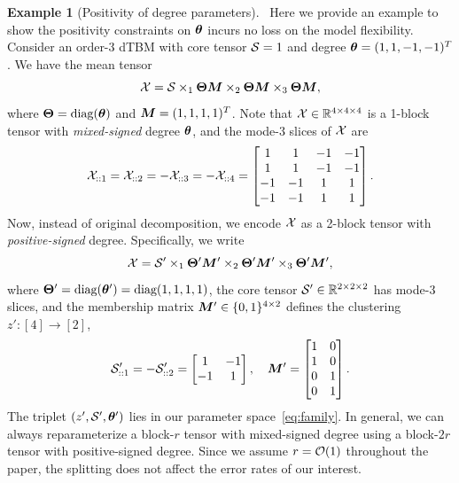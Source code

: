 \documentclass[lettersize,onecolumn,journal]{IEEEtran}
\theoremstyle{definition}
\theoremstyle{definition}
\newtheorem{example}{Example}
\begin{document}
\begin{example}[Positivity of degree parameters]~\label{ex:positive}
Here we provide an example to show the positivity constraints on $\boldsymbol{\theta}$ incurs no loss on the model flexibility. 
Consider an order-3 dTBM with core tensor $\mathcal{S} = 1$ and degree $\boldsymbol{\theta} = (1,1,-1, -1)^T$. We have the mean tensor 
\begin{equation}
    \mathcal{X} = \mathcal{S} \times_1 \boldsymbol{\Theta} \bm M \times_2 \boldsymbol{\Theta} \bm M \times_3 \boldsymbol{\Theta} \bm M,
\end{equation}
where $\boldsymbol{\Theta} = \text{diag}(\boldsymbol{\theta})$ and $\bm M = (1,1,1,1)^T$. Note that $\mathcal{X} \in \mathbb{R}^{4 \times 4 \times 4}$ is a 1-block tensor with \emph{mixed-signed} degree $\boldsymbol{\theta}$, and the mode-3 slices of $\mathcal{X}$ are
\begin{equation}
    \mathcal{X}_{::1} = \mathcal{X}_{::2} = - \mathcal{X}_{::3} = -\mathcal{X}_{::4}  = \begin{bmatrix}
    1 & 1& -1& -1 \\
    1 & 1& -1& -1 \\
    -1& -1&1 & 1\\
     -1& -1&1 & 1
    \end{bmatrix}.
\end{equation}
Now, instead of original decomposition, we encode $\mathcal{X}$ as a 2-block tensor with \emph{positive-signed} degree. Specifically, we write
\begin{equation}
     \mathcal{X} = \mathcal{S}' \times_1 \boldsymbol{\Theta}' \bm M' \times_2 \boldsymbol{\Theta}' \bm M'  \times_3 \boldsymbol{\Theta}' \bm M' , 
\end{equation}
where $\boldsymbol{\Theta}' = \text{diag}(\boldsymbol{\theta}') = \text{diag}(1,1, 1, 1)$, the core tensor $\mathcal{S}' \in \mathbb{R}^{2 \times 2 \times 2}$ has mode-3 slices, and the membership matrix $\bm M'\in\{0,1\}^{4\times 2}$ defines the clustering $z'\colon[4]\to[2]$,
\begin{equation}
    \mathcal{S}'_{::1} = -\mathcal{S}'_{::2} = \begin{bmatrix}
    1 & -1 \\
    -1 & 1
    \end{bmatrix}, \quad \bm M' = \begin{bmatrix}
   1 & 0 \\
   1 &0 \\
    0 & 1 \\
    0&1
    \end{bmatrix}.
\end{equation}
 The triplet $(z',\mathcal{S}', \boldsymbol{\theta}')$ lies in our parameter space~\eqref{eq:family}. In general, we can always reparameterize a block-$r$ tensor with mixed-signed degree using a block-$2r$ tensor with positive-signed degree. Since we assume $r=\mathcal{O}(1)$ throughout the paper, the splitting does not affect the error rates of our interest.\end{example}
\end{document}
